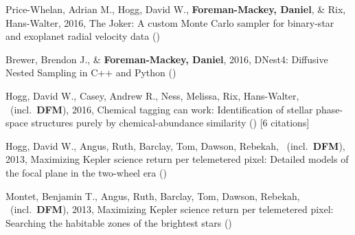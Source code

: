 \item Price-Whelan, Adrian M., Hogg, David W., \textbf{Foreman-Mackey, Daniel}, \& Rix, Hans-Walter, 2016, The Joker: A custom Monte Carlo sampler for binary-star and exoplanet radial velocity data ()

\item Brewer, Brendon J., \& \textbf{Foreman-Mackey, Daniel}, 2016, DNest4: Diffusive Nested Sampling in C++ and Python ()

\item Hogg, David W., Casey, Andrew R., Ness, Melissa, Rix, Hans-Walter, \etal\ (incl.\ \textbf{DFM}), 2016, Chemical tagging can work: Identification of stellar phase-space structures purely by chemical-abundance similarity () [6 citations]

\item Hogg, David W., Angus, Ruth, Barclay, Tom, Dawson, Rebekah, \etal\ (incl.\ \textbf{DFM}), 2013, Maximizing Kepler science return per telemetered pixel: Detailed models of the focal plane in the two-wheel era ()

\item Montet, Benjamin T., Angus, Ruth, Barclay, Tom, Dawson, Rebekah, \etal\ (incl.\ \textbf{DFM}), 2013, Maximizing Kepler science return per telemetered pixel: Searching the habitable zones of the brightest stars ()